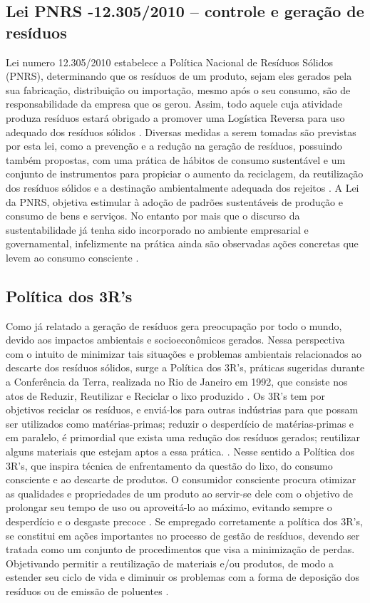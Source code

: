 \documentclass[
	12pt,				%
	openany,			%
	twoside,			%
	a4paper,			%
	english,			%
	french,				%
	spanish,			%
	brazil				%
	]{abntex2}
\begin{document}
\subsection{Lei PNRS -12.305/2010 – controle e geração de resíduos}

 Lei numero 12.305/2010 estabelece a Política Nacional de Resíduos Sólidos (PNRS), determinando que os resíduos de um produto, sejam eles gerados pela sua fabricação, distribuição ou importação, mesmo após o seu consumo, são de responsabilidade da empresa que os gerou. Assim, todo aquele cuja atividade produza resíduos estará obrigado a promover uma Logística Reversa para uso adequado dos resíduos sólidos \cite{assg}.
Diversas medidas a serem tomadas são previstas por esta lei, como a prevenção e a redução na geração de resíduos, possuindo também propostas, com uma prática de hábitos de consumo sustentável e um conjunto de instrumentos para propiciar o aumento da reciclagem, da reutilização dos resíduos sólidos e a destinação ambientalmente adequada dos rejeitos \cite{ifea}.
A Lei da PNRS, objetiva estimular à adoção de padrões sustentáveis de produção e consumo de bens e serviços. No entanto por mais que o discurso da sustentabilidade já tenha sido incorporado no ambiente empresarial e governamental, infelizmente na prática ainda são observadas ações concretas que levem ao consumo consciente \cite{sme}.

\subsection{Política dos 3R’s}

Como já relatado a geração de resíduos gera preocupação por todo o mundo, devido aos impactos ambientais e socioeconômicos gerados. Nessa perspectiva com o intuito de minimizar tais situações e problemas ambientais relacionados ao descarte dos resíduos sólidos, surge a Política dos 3R’s, práticas sugeridas durante a Conferência da Terra, realizada no Rio de Janeiro em 1992, que consiste nos atos de Reduzir, Reutilizar e Reciclar o lixo produzido \cite{mmufasm}.
Os 3R’s tem por objetivos reciclar os resíduos, e enviá-los para outras indústrias para que possam ser utilizados como matérias-primas; reduzir o desperdício de matérias-primas e em paralelo, é primordial que exista uma redução dos resíduos gerados; reutilizar alguns materiais que estejam aptos a essa prática. \cite{ajsr}.
Nesse sentido a Política dos 3R’s, que inspira técnica de enfrentamento da questão do lixo, do consumo consciente e ao descarte de produtos. O consumidor consciente procura otimizar as qualidades e propriedades de um produto ao servir-se dele com o objetivo de prolongar seu tempo de uso ou aproveitá-lo ao máximo, evitando sempre o desperdício e o desgaste precoce \cite{aflrsssfqaa}. 
Se empregado corretamente a política dos 3R’s, se constitui em ações importantes no processo de gestão de resíduos, devendo ser tratada como um conjunto de procedimentos que visa a minimização de perdas.  Objetivando permitir a reutilização de materiais e/ou produtos, de modo a estender seu ciclo de vida e diminuir os problemas com a forma de deposição dos resíduos ou de emissão de poluentes \cite{nmca}. 
\end{document}
